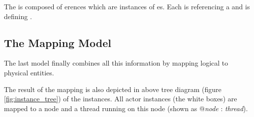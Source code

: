 

The  is composed of erences which are instances
of es. Each  is referencing a 
 and is defining .



\subsection{The Mapping Model}
\label{sec:mapping_model}

The last model finally combines all this information by mapping logical to physical entities.



The result of the mapping is also depicted in above tree diagram (figure \ref{fig:instance_tree})
of the instances. All actor instances (the white boxes) are mapped to a node and a thread running on this node
(shown as @\textit{node} : \textit{thread}).

